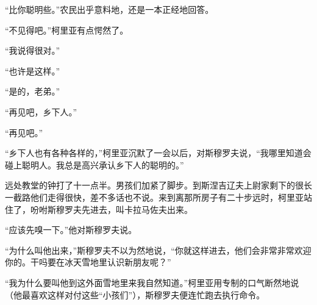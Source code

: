 \par “比你聪明些。”农民出乎意料地，还是一本正经地回答。
\par “不见得吧。”柯里亚有点愕然了。
\par “我说得很对。”
\par “也许是这样。”
\par “是的，老弟。”
\par “再见吧，乡下人。”
\par “再见吧。”
\par “乡下人也有各种各样的，”柯里亚沉默了一会以后，对斯穆罗夫说，“我哪里知道会碰上聪明人。我总是高兴承认乡下人的聪明的。”
\par 远处教堂的钟打了十一点半。男孩们加紧了脚步。到斯涅吉辽夫上尉家剩下的很长一截路他们走得很快，差不多话也不说。来到离那所房子有二十步远时，柯里亚站住了，吩咐斯穆罗夫先进去，叫卡拉马佐夫出来。
\par “应该先嗅一下。”他对斯穆罗夫说。
\par “为什么叫他出来，”斯穆罗夫不以为然地说，“你就这样进去，他们会非常非常欢迎你的。干吗要在冰天雪地里认识新朋友呢？”
\par “我为什么要叫他到这外面雪地里来我自然知道。”柯里亚用专制的口气断然地说（他最喜欢这样对付这些“小孩们”），斯穆罗夫便连忙跑去执行命令。
